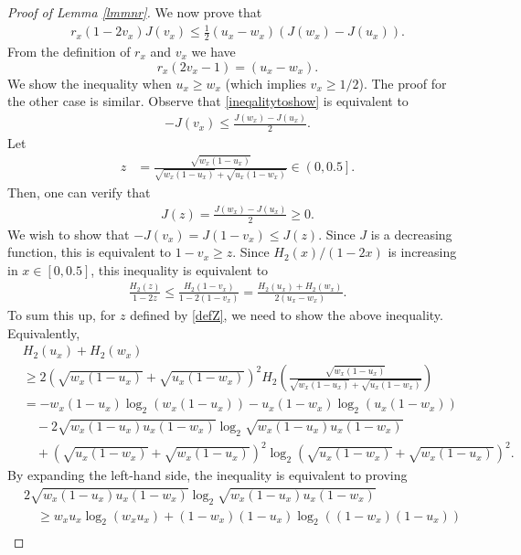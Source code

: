 \documentclass[conference,letterpaper,onecolumn]{IEEEtran}
\theoremstyle{plain}%
\begin{document}
\begin{proof}[Proof of Lemma \ref{lmmnr}]
We now prove that
\begin{align}
    r_x(1 - 2v_x)J(v_x) \leq \frac{1}{2}(u_x - w_x)(J(w_x) - J(u_x)).\label{ineqalitytoshow}
\end{align}
From the definition of $r_x$ and $v_x$ we have
$$r_x(2v_x-1)=(u_x-w_x).$$
We show the inequality when $u_x\geq w_x$ (which implies $v_x\geq 1/2$). The proof for the other case is similar. Observe that \eqref{ineqalitytoshow} is equivalent to
\begin{align*}
    -J(v_x) \leq \frac{J(w_x) - J(u_x)}{2}.
\end{align*}
Let
\begin{align}
    z &= \frac{\sqrt{w_x(1 - u_x)}}{\sqrt{w_x(1 - u_x)} + \sqrt{u_x(1 - w_x)}}\in\left(0,0.5\right].\label{defZ}
\end{align}
Then, one can verify that 
\begin{align}
    J(z) = \frac{J(w_x) - J(u_x)}{2}\geq 0.\label{defZ2}
\end{align}
We wish to show that $-J(v_x)=J(1-v_x)\leq J(z)$. Since $J$ is a decreasing function, this is equivalent to $1-v_x\geq z$. Since $H_2(x)/(1-2x)$ is increasing in $x\in[0,0.5]$, this inequality is equivalent to
\begin{align*}
    \frac{H_2(z)}{1-2z}\leq \frac{H_2(1-v_x)}{1-2(1-v_x)} = \frac{H_2(u_x) + H_2(w_x)}{2(u_x-w_x)}.
\end{align*}
To sum this up, for $z$ defined by \eqref{defZ}, we need to show the above inequality. Equivalently,
{\begin{align*}
    &H_2(u_x) + H_2(w_x)\\
    &\geq 2\left(\sqrt{w_x(1 - u_x)} + \sqrt{u_x(1 - w_x)}\right)^2H_2\left(\frac{\sqrt{w_x(1 - u_x)}}{\sqrt{w_x(1 - u_x)} + \sqrt{u_x(1 - w_x)}}\right)\\
    &= -w_x(1-u_x)\log_2(w_x(1 - u_x)) -u_x(1-w_x)\log_2(u_x(1 - w_x)) \\
    &\quad- 2\sqrt{w_x(1-u_x)u_x(1-w_x)}\log_2\sqrt{w_x(1-u_x)u_x(1-w_x)} \\
    &\quad+\left(\sqrt{u_x(1-w_x)} + \sqrt{w_x(1-u_x)}\right)^2\log_2\left(\sqrt{u_x(1-w_x)} + \sqrt{w_x(1-u_x)}\right)^2.
\end{align*}}
By expanding the left-hand side, the inequality is equivalent to proving
{\begin{align}
    &2\sqrt{w_x(1-u_x)u_x(1-w_x)}\log_2\sqrt{w_x(1-u_x)u_x(1-w_x)}\nonumber \\
    &\quad\geq w_xu_x\log_2(w_xu_x) + (1-w_x)(1 - u_x)\log_2((1 - w_x)(1-u_x))\nonumber\\

\end{align}}
\end{proof}
\end{document}
